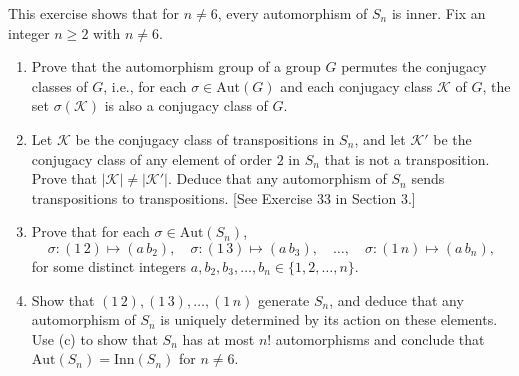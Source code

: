 \documentclass{article}
\newenvironment{problem}[2][Problem]{\begin{trivlist}
\item[\hskip \labelsep {\bfseries #1}\hskip \labelsep {\bfseries #2.}]}{\end{trivlist}}
\begin{document}
\begin{problem}{18}
    This exercise shows that for $n \neq 6$, every automorphism of $S_n$ is inner. Fix an integer $n \geq 2$ with $n \neq 6$.
\begin{enumerate}
    \item[(a)] Prove that the automorphism group of a group $G$ permutes the conjugacy classes of $G$, i.e., for each $\sigma \in \text{Aut}(G)$ and each conjugacy class $\mathcal{K}$ of $G$, the set $\sigma(\mathcal{K})$ is also a conjugacy class of $G$.
    \item[(b)] Let $\mathcal{K}$ be the conjugacy class of transpositions in $S_n$, and let $\mathcal{K}'$ be the conjugacy class of any element of order $2$ in $S_n$ that is not a transposition. Prove that $|\mathcal{K}| \neq |\mathcal{K}'|$. Deduce that any automorphism of $S_n$ sends transpositions to transpositions. [See Exercise 33 in Section 3.]
    \item[(c)] Prove that for each $\sigma \in \text{Aut}(S_n)$,
    \[
    \sigma : (1 \, 2) \mapsto (a \, b_2), \quad \sigma : (1 \, 3) \mapsto (a \, b_3), \quad \dots, \quad \sigma : (1 \, n) \mapsto (a \, b_n),
    \]
    for some distinct integers $a, b_2, b_3, \dots, b_n \in \{1, 2, \dots, n\}$.
    \item[(d)] Show that $(1 \, 2), (1 \, 3), \dots, (1 \, n)$ generate $S_n$, and deduce that any automorphism of $S_n$ is uniquely determined by its action on these elements. Use (c) to show that $S_n$ has at most $n!$ automorphisms and conclude that $\text{Aut}(S_n) = \text{Inn}(S_n)$ for $n \neq 6$.
\end{enumerate}
\end{problem}
\end{document}
